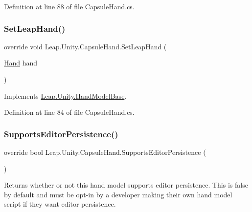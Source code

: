 Definition at line 88 of file Capsule\+Hand.\+cs.

\mbox{\label{class_leap_1_1_unity_1_1_capsule_hand_a36435c4a198b8fcf38560846141c15a5}} 
\subsubsection{\texorpdfstring{SetLeapHand()}{SetLeapHand()}}
{\footnotesize\ttfamily override void Leap.\+Unity.\+Capsule\+Hand.\+Set\+Leap\+Hand (\begin{DoxyParamCaption}\item[{\mbox{\hyperlink{class_leap_1_1_hand}{Hand}}}]{hand }\end{DoxyParamCaption})\hspace{0.3cm}{\ttfamily [virtual]}}



Implements \mbox{\hyperlink{class_leap_1_1_unity_1_1_hand_model_base_ab8830cac842482ed7d1045beeb54e98c}{Leap.\+Unity.\+Hand\+Model\+Base}}.



Definition at line 84 of file Capsule\+Hand.\+cs.

\mbox{\label{class_leap_1_1_unity_1_1_capsule_hand_ae914f49384f678f6613cd95f71eae24f}} 
\subsubsection{\texorpdfstring{SupportsEditorPersistence()}{SupportsEditorPersistence()}}
{\footnotesize\ttfamily override bool Leap.\+Unity.\+Capsule\+Hand.\+Supports\+Editor\+Persistence (\begin{DoxyParamCaption}{ }\end{DoxyParamCaption})\hspace{0.3cm}{\ttfamily [virtual]}}



Returns whether or not this hand model supports editor persistence. This is false by default and must be opt-\/in by a developer making their own hand model script if they want editor persistence. 



